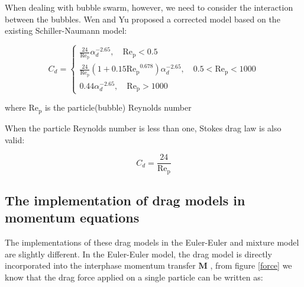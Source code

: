 When dealing with bubble swarm, however, we need to consider the interaction between the bubbles. Wen and Yu proposed a corrected model based on the existing Schiller-Naumann model:

\begin{equation}\label{eq:wenyudrag}
  C_d=\begin{cases}
                \frac{24}{\mathrm{Re_p}}\alpha_d^{-2.65}, \quad \mathrm{Re_p}<0.5 \\
               \frac{24}{\mathrm{Re_p}}(1+0.15\mathrm{Re_p}^{0.678}) \alpha_d^{-2.65}, \quad 0.5<\mathrm{Re_p} <1000\\
               0.44\alpha_d^{-2.65}, \quad \mathrm{Re_p}>1000
        \end{cases}
\end{equation}

where $\mathrm{Re_p}$ is the particle(bubble) Reynolds number


When the particle Reynolds number is less than one, Stokes drag law is also valid:

\begin{equation}
    C_d = \frac{24}{\mathrm{Re_p}}
\end{equation}




\subsection{The implementation of drag models in momentum equations}

The implementations of these drag models in the Euler-Euler and mixture model are slightly different. In the Euler-Euler model, the drag model is directly incorporated into the interphase momentum transfer $\mathbf{M}$ \cite{oliveira2003numerical}, from figure \ref{force} we know that the drag force applied on a single particle can be written as:

